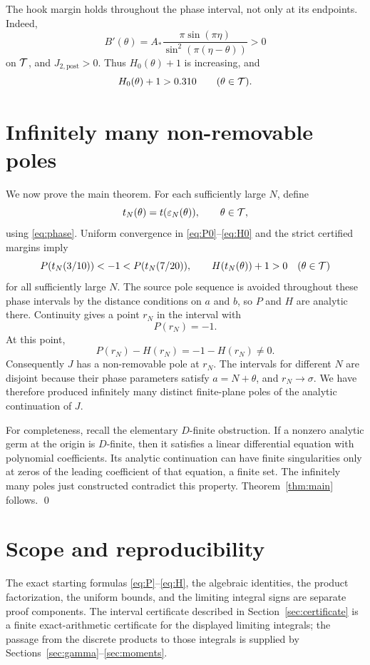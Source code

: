 \documentclass[11pt]{article}
\theoremstyle{definition}
\theoremstyle{remark}
\newcommand{\eps}{\varepsilon}
\begin{document}
The hook margin holds throughout the phase interval, not only at its
endpoints.  Indeed,
\[
 B'(\theta)=
 A_*\frac{\pi\sin(\pi\eta)}
 {\sin^2(\pi(\eta-\theta))}>0
\]
on \({\cal T}\), and \(J_{2,\mathrm{post}}>0\).  Thus \(H_0(\theta)+1\)
is increasing, and
\begin{equation}\label{eq:Hmargin}
  H_0(\theta)+1>0.310
  \qquad(\theta\in{\cal T}).
\end{equation}

\section{Infinitely many non-removable poles}\label{sec:conclusion}

We now prove the main theorem.  For each sufficiently large \(N\), define
\[
  t_N(\theta)=t(\eps_N(\theta)),
  \qquad\theta\in{\cal T},
\]
using \eqref{eq:phase}.  Uniform convergence in
\eqref{eq:P0}--\eqref{eq:H0} and the strict certified margins imply
\[
  P(t_N(3/10))<-1
  <P(t_N(7/20)),
  \qquad
  H(t_N(\theta))+1>0
  \quad(\theta\in{\cal T})
\]
for all sufficiently large \(N\).  The source pole sequence is avoided
throughout these phase intervals by the distance conditions on \(a\) and
\(b\), so \(P\) and \(H\) are analytic there.  Continuity gives a point
\(r_N\) in the interval with
\[
  P(r_N)=-1.
\]
At this point,
\[
  P(r_N)-H(r_N)=-1-H(r_N)\ne0.
\]
Consequently \(J\) has a non-removable pole at \(r_N\).  The intervals for
different \(N\) are disjoint because their phase parameters satisfy
\(a=N+\theta\), and \(r_N\to\sigma\).  We have therefore produced infinitely
many distinct finite-plane poles of the analytic continuation of \(J\).

For completeness, recall the elementary \(D\)-finite obstruction.  If a
nonzero analytic germ at the origin is \(D\)-finite, then it satisfies a
linear differential equation with polynomial coefficients.  Its analytic
continuation can have finite singularities only at zeros of the leading
coefficient of that equation, a finite set.  The infinitely many poles just
constructed contradict this property.  Theorem~\ref{thm:main} follows.
\qed

\section{Scope and reproducibility}\label{sec:scope}

The exact starting formulas \eqref{eq:P}--\eqref{eq:H}, the algebraic
identities, the product factorization, the uniform bounds, and the limiting
integral signs are separate proof components.  The interval certificate
described in Section~\ref{sec:certificate} is a finite exact-arithmetic
certificate for the displayed limiting integrals; the passage from the
discrete products to those integrals is supplied by
Sections~\ref{sec:gamma}--\ref{sec:moments}.
\end{document}
